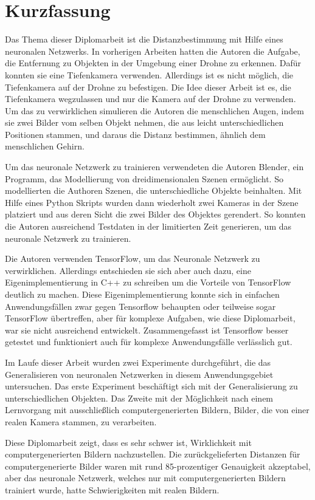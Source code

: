 \chapter{Kurzfassung}

Das Thema dieser Diplomarbeit ist die Distanzbestimmung mit Hilfe eines neuronalen Netzwerks. In vorherigen Arbeiten hatten die Autoren die Aufgabe, die Entfernung zu Objekten in der Umgebung einer Drohne zu erkennen. Dafür konnten sie eine Tiefenkamera verwenden. Allerdings ist es nicht möglich, die Tiefenkamera auf der Drohne zu befestigen. Die Idee dieser Arbeit ist es, die Tiefenkamera wegzulassen und nur die Kamera auf der Drohne zu verwenden. Um das zu verwirklichen simulieren die Autoren die menschlichen Augen, indem sie zwei Bilder vom selben Objekt nehmen, die aus leicht unterschiedlichen Positionen stammen, und daraus die Distanz bestimmen, ähnlich dem menschlichen Gehirn.

Um das neuronale Netzwerk zu trainieren verwendeten die Autoren Blender, ein Programm, das Modellierung von dreidimensionalen Szenen ermöglicht. So modellierten die Authoren Szenen, die unterschiedliche Objekte beinhalten. Mit Hilfe eines Python Skripts wurden dann wiederholt zwei Kameras in der Szene platziert und aus deren Sicht die zwei Bilder des Objektes gerendert. So konnten die Autoren ausreichend Testdaten in der limitierten Zeit generieren, um das neuronale Netzwerk zu trainieren.

Die Autoren verwenden TensorFlow, um das Neuronale Netzwerk zu verwirklichen. Allerdings entschieden sie sich aber auch dazu, eine Eigenimplementierung in C++ zu schreiben um die Vorteile von TensorFlow deutlich zu machen. Diese Eigenimplementierung konnte sich in einfachen Anwendungsfällen zwar gegen Tensorflow behaupten oder teilweise sogar TensorFlow übertreffen, aber für komplexe Aufgaben, wie diese Diplomarbeit, war sie nicht ausreichend entwickelt. Zusammengefasst ist Tensorflow besser getestet und funktioniert auch für komplexe Anwendungsfälle verlässlich gut.

Im Laufe dieser Arbeit wurden zwei Experimente durchgeführt, die das Generalisieren von neuronalen Netzwerken in diesem Anwendungsgebiet untersuchen. Das erste Experiment beschäftigt sich mit der Generalisierung zu unterschiedlichen Objekten. Das Zweite mit der Möglichkeit nach einem Lernvorgang mit ausschließlich computergenerierten Bildern, Bilder, die von einer realen Kamera stammen, zu verarbeiten.

Diese Diplomarbeit zeigt, dass es sehr schwer ist, Wirklichkeit mit computergenerierten Bildern nachzustellen. Die zurückgelieferten Distanzen für computergenerierte Bilder waren mit rund 85-prozentiger Genauigkeit akzeptabel, aber das neuronale Netzwerk, welches nur mit computergenerierten Bildern trainiert wurde, hatte Schwierigkeiten mit realen Bildern.


